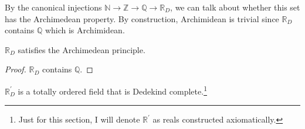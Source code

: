   By the canonical injections $\mathbb{N} \rightarrow \mathbb{Z} \rightarrow \mathbb{Q} \rightarrow \mathbb{R}_D$, we can talk about whether this set has the Archimedean property. By construction, Archimidean is trivial since $\mathbb{R}_D$ contains $\mathbb{Q}$ which is Archimidean. 

  \begin{theorem}
    $\mathbb{R}_D$ satisfies the Archimedean principle. 
  \end{theorem}
  \begin{proof} 
    $\mathbb{R}_D$ contains $\mathbb{Q}$. 
  \end{proof}

  \begin{definition}
    $\mathbb{R}_D^\prime$ is a totally ordered field that is Dedekind complete.\footnote{Just for this section, I will denote $\mathbb{R}^\prime$ as reals constructed axiomatically.}
  \end{definition}

